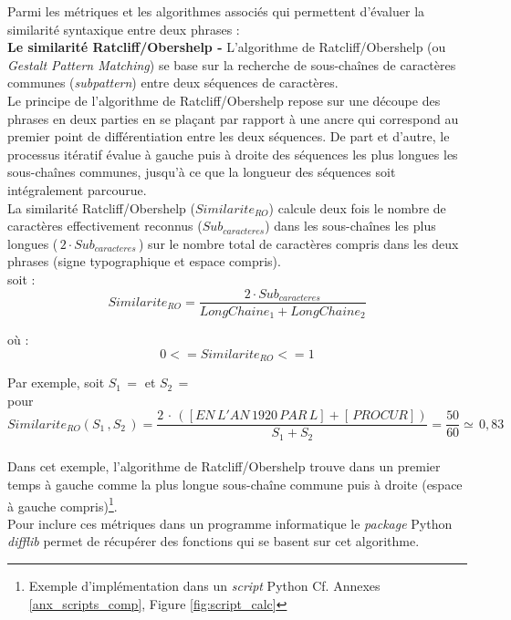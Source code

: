 Parmi les métriques et les algorithmes associés qui permettent d'évaluer la similarité syntaxique entre deux phrases :\\

\textbf{Le similarité Ratcliff/Obershelp -} L'algorithme de Ratcliff/Obershelp (ou \textit{Gestalt Pattern Matching}) se base sur la recherche de sous-chaînes de caractères communes (\textit{subpattern}) entre deux séquences de caractères.\\

Le principe de l'algorithme de Ratcliff/Obershelp repose sur une découpe des phrases en deux parties en se plaçant par rapport à une ancre qui correspond au premier point de différentiation entre les deux séquences. De part et d'autre, le processus itératif évalue à gauche puis à droite des séquences les plus longues les sous-chaînes communes, jusqu'à ce que la longueur des séquences soit intégralement parcourue.\\
\newpage
La similarité Ratcliff/Obershelp ($ Similarite_{RO} $) calcule deux fois le nombre de caractères effectivement reconnus ($Sub_{caracteres}$) dans les sous-chaînes les plus longues ($\, 2 \cdot Sub_{caracteres} \,$) sur le nombre total de caractères compris dans les deux phrases (signe typographique et espace compris).\\

soit : $$ Similarite_{RO} = \frac{2 \cdot Sub_{caracteres}}{LongChaine_1+LongChaine_2} $$

où : $$ 0 <= Similarite_{RO} <= 1 $$

Par exemple, soit $ S_1 \,= $  et $ S_2 \,=$ \\

pour $$Similarite_{RO}(S_1 \,, S_2 \,) = \frac{2 \, \cdot \, ([EN\, L'AN\, 1920\, PAR\, L] + [\, PROCUR])}{S_1+S_2} = \frac{50}{60} \simeq  \, 0,83$$\\ 

Dans cet exemple, l'algorithme de Ratcliff/Obershelp trouve dans un premier temps  à gauche comme la plus longue sous-chaîne commune puis à droite  (espace à gauche compris)\footnote{Exemple d'implémentation dans un \textit{script} Python Cf. Annexes \ref{anx_scripts_comp}, Figure \ref{fig:script_calc}}.\\

Pour inclure ces métriques dans un programme informatique le \textit{package} Python \textit{difflib} permet de récupérer des fonctions qui se basent sur cet algorithme.\\

